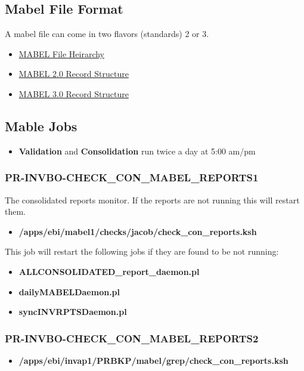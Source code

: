 \documentclass[12pt,twoside]{article}
\begin{document}
\subsection{Mabel File Format}
\label{sec:orgheadline37}
A mabel file can  come in two flavors (standards) 2 or 3. 
\begin{itemize}
\item \href{docs/MABEL\%20Hierarchy.pdf}{MABEL File Heirarchy}
\item \href{docs/Mable2_record_structure_C07.pdf}{MABEL 2.0 Record Structure}
\item \href{docs/Mabel3_record_structure_CH07.pdf}{MABEL 3.0 Record Structure}
\end{itemize}
\subsection{Mable Jobs}
\label{sec:orgheadline46}
\begin{itemize}
\item \textbf{Validation} and \textbf{Consolidation} run twice a day at 5:00 am/pm
\end{itemize}
\small
\subsubsection{PR-INVBO-CHECK\_CON\_MABEL\_REPORTS1}
\label{sec:orgheadline38}
The consolidated reports monitor. If the reports are not running this will restart them.
\begin{itemize}
\item \textbf{/apps/ebi/mabel1/checks/jacob/check\_con\_reports.ksh}
\end{itemize}

This job will restart the following jobs if they are found to be not running:
\begin{itemize}
\item \textbf{ALLCONSOLIDATED\_report\_daemon.pl}
\item \textbf{dailyMABELDaemon.pl}
\item \textbf{syncINVRPTSDaemon.pl}
\end{itemize}
\subsubsection{PR-INVBO-CHECK\_CON\_MABEL\_REPORTS2}
\label{sec:orgheadline39}
\begin{itemize}
\item \textbf{/apps/ebi/invap1/PRBKP/mabel/grep/check\_con\_reports.ksh}
\end{itemize}
\end{document}
